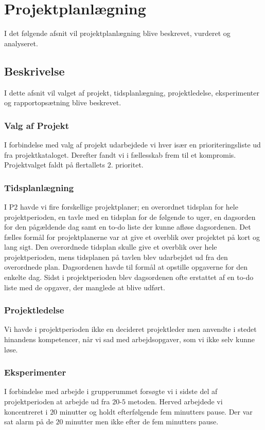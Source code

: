 \chapter{Projektplanlægning}
I det følgende afsnit vil projektplanlægning blive beskrevet, vurderet og analyseret. 

\section{Beskrivelse}
I dette afsnit vil valget af projekt, tidsplanlægning, projektledelse, eksperimenter og rapportopsætning blive beskrevet.

\subsection{Valg af Projekt}
I forbindelse med valg af projekt udarbejdede vi hver især en prioriteringsliste ud fra projektkataloget. Derefter fandt vi i fællesskab frem til et kompromis. Projektvalget faldt på flertallets $2$. prioritet.

\subsection{Tidsplanlægning}
I P$2$ havde vi fire forskellige projektplaner; en overordnet tidsplan for hele projektperioden, en tavle med en tidsplan for de følgende to uger, en dagsorden for den pågældende dag samt en to-do liste der kunne afløse dagsordenen. 
Det fælles formål for projektplanerne var at give et overblik over projektet på kort og lang sigt.
Den overordnede tidsplan skulle give et overblik over hele projektperioden, mens tidsplanen på tavlen blev udarbejdet ud fra den overordnede plan. Dagsordenen havde til formål at opstille opgaverne for den enkelte dag. Sidst i projektperioden blev dagsordenen ofte erstattet af en to-do liste med de opgaver, der manglede at blive udført.

\subsection{Projektledelse}
Vi havde i projektperioden ikke en decideret projektleder men anvendte i stedet hinandens kompetencer, når vi sad med arbejdsopgaver, som vi ikke selv kunne løse.

\subsection{Eksperimenter}
I forbindelse med arbejde i grupperummet forsøgte vi i sidste del af projektperioden at arbejde ud fra $20$-$5$ metoden. Herved arbejdede vi koncentreret i $20$ minutter og holdt efterfølgende fem minutters pause. Der var sat alarm på de $20$ minutter men ikke efter de fem minutters pause. 

